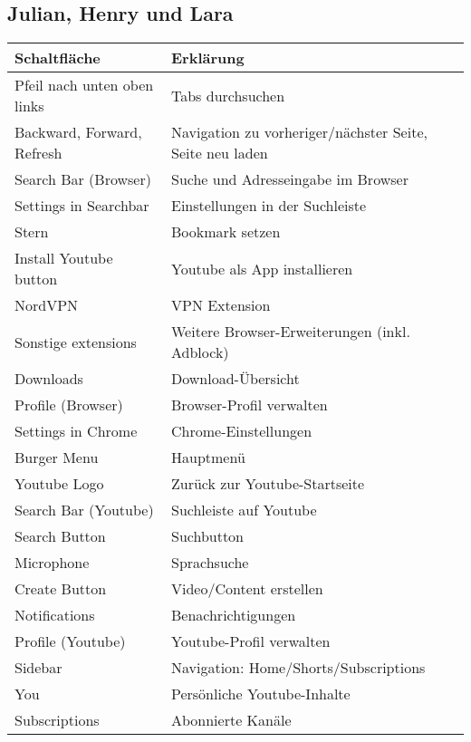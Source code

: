 \documentclass[a4paper,10pt]{article}
\begin{document}
    \subsection{Julian, Henry und Lara}
    \begin{tabular}{|p{5cm}|p{9cm}|}
        \hline
        \textbf{Schaltfläche} & \textbf{Erklärung} \\
        \hline
        Pfeil nach unten oben links & Tabs durchsuchen \\
        \hline
        Backward, Forward, Refresh & Navigation zu vorheriger/nächster Seite, Seite neu laden \\
        \hline
        Search Bar (Browser) & Suche und Adresseingabe im Browser \\
        \hline
        Settings in Searchbar & Einstellungen in der Suchleiste \\
        \hline
        Stern & Bookmark setzen \\
        \hline
        Install Youtube button & Youtube als App installieren \\
        \hline
        NordVPN & VPN Extension \\
        \hline
        Sonstige extensions & Weitere Browser-Erweiterungen (inkl. Adblock) \\
        \hline
        Downloads & Download-Übersicht \\
        \hline
        Profile (Browser) & Browser-Profil verwalten \\
        \hline
        Settings in Chrome & Chrome-Einstellungen \\
        \hline
        Burger Menu & Hauptmenü \\
        \hline
        Youtube Logo & Zurück zur Youtube-Startseite \\
        \hline
        Search Bar (Youtube) & Suchleiste auf Youtube \\
        \hline
        Search Button & Suchbutton \\
        \hline
        Microphone & Sprachsuche \\
        \hline
        Create Button & Video/Content erstellen \\
        \hline
        Notifications & Benachrichtigungen \\
        \hline
        Profile (Youtube) & Youtube-Profil verwalten \\
        \hline
        Sidebar & Navigation: Home/Shorts/Subscriptions \\
        \hline
        You & Persönliche Youtube-Inhalte \\
        \hline
        Subscriptions & Abonnierte Kanäle \\
        \hline
    \end{tabular}
\end{document}
